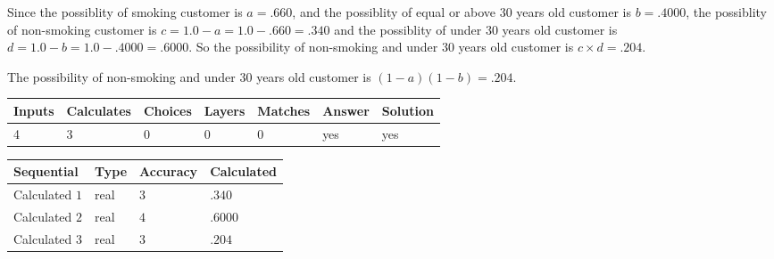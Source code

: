 \documentclass[12pt]{article}
\begin{document}
 
 
\noindent{}
 
 

Since the possiblity of  %
smoking customer is $ a =  %
.660 $,
and the possiblity of  %
equal or above 30 years old customer is $ b =  %
.4000 $,
the possiblity of  %
non-smoking customer is $ c = 1.0 - a = 1.0 -
.660
=  %
.340 $ and the possiblity of  %
under 30 years old
customer is $ d = 1.0 - b = 1.0 -  %
.4000 =  %
.6000  $.
So the possibility of  %
 non-smoking and  %
under 30 years old
customer is $ c \times d =  %
.204 $.
 
 
 
\noindent{}
 
 

 
 
 
\noindent{}
 
 

The possibility of  %
 non-smoking and  %
under 30 years old
customer is $ (1-a)(1-b) =  %
.204 $.
 
 
\noindent{}
 
 

 
\vspace{0.3in}
   
   
   
   
\noindent\begin{tabular}{|l|l|l|l|l|l|l|}
 \hline
Inputs & Calculates & Choices & Layers & Matches & Answer & Solution \\ \hline
           4 & 
           3 & 
           0
  & 
           0 & 
           0 & 
  yes & 
  yes 
  \\ \hline
 \end{tabular}
   
   
   
   
\noindent{}
   
   
  
  
\noindent\begin{tabular}{|l|l|l|l|}
\hline
 Sequential & Type & Accuracy & Calculated \\ 
\hline
 
 
  Calculated $           1$ & real & $           3 $ & 
 $ .340 $ 
 \\  \hline  
 
 
  Calculated $           2$ & real & $           4 $ & 
 $ .6000 $ 
 \\  \hline  
 
 
  Calculated $           3$ & real & $           3 $ & 
 $ .204 $ 
 \\  \hline  
 \end{tabular}
   
\end{document}
